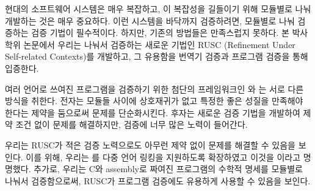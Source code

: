 
\begin{abstractalt}
현대의 소프트웨어 시스템은 매우 복잡하고, 이 복잡성을 길들이기 위해 모듈별로 나눠 개발하는 것은 매우 중요하다.
이런 시스템을 바닥까지 검증하려면, 모듈별로 나눠 검증하는 검증 기법이 필수적이다.
하지만, 기존의 방법들은 만족스럽지 못하다.
본 박사학위 논문에서 우리는 나눠서 검증하는 새로운 기법인 RUSC (Refinement
Under Self-related Contexts)를 개발하고, 그 유용함을 번역기 검증과 프로그램 검증을 통해 입증한다.

여러 언어로 쓰여진 프로그램을 검증하기 위한 첨단의 프레임워크인 \ccx{}와 \ccc{}는 서로 다른 방식을 취한다.
전자는 모듈들 사이에 상호재귀가 없고 특정한 좋은 성질을 만족해야 한다는 제약을 둠으로써 문제를 단순화시킨다.
후자는 새로운 검증 기법을 개발하여 제약 조건 없이 문제를 해결하지만, 검증에 너무 많은 노력이 들어간다.

우리는 RUSC가 적은 검증 노력으로도 아무런 제약 없이 문제를 해결할 수 있음을 보인다.
이를 위해, 우리는 \cc{}를 다중 언어 링킹을 지원하도록 확장하였고 이것을 \ccm{}이라고 명명했다.
추가로, 우리는 C와 assembly로 짜여진 프로그램의 수학적 명세를 모듈별로 나눠서 검증함으로써, RUSC가 프로그램 검증에도 유용하게 사용할 수 있음을 보인다.

\end{abstractalt}

